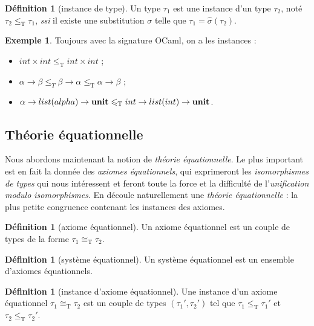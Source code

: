 \documentclass[a4paper]{report}
\theoremstyle{definition}
\newtheorem{definition}[theoreme]{Définition}
\newtheorem{exemple}[theoreme]{Exemple}
\newcommand{\ssi}{\textit{ssi}\xspace}
\newcommand{\unit}{\bold{unit}}
\newcommand{\T}{\mathrm{T}}
\begin{document}
\begin{definition}[instance de type]
  Un type $\tau_1$ est une instance d'un type $\tau_2$, noté $\tau_2 \leqslant_\T \tau_1$, \ssi il existe une substitution $\sigma$ telle que $\tau_1 = \hat\sigma (\tau_2)$.
\end{definition}

\begin{exemple}
  Toujours avec la signature OCaml, on a les instances :
  \begin{itemize}
    \item $int \times int \leqslant_\T int \times int$ ;
    \item $\alpha \rightarrow \beta \leqslant_T \beta \rightarrow \alpha \leqslant_\T \alpha \rightarrow \beta$ ;
    \item $\alpha \rightarrow list (alpha) \rightarrow \unit \leqslant_\T int \rightarrow list (int) \rightarrow \unit$.
  \end{itemize}
\end{exemple}


\subsection{Théorie équationnelle}

Nous abordons maintenant la notion de \emph{théorie équationnelle}. Le plus important est en fait la donnée des \emph{axiomes équationnels}, qui exprimeront les \emph{isomorphismes de types} qui nous intéressent  et feront toute la force et la difficulté de l'\emph{unification modulo isomorphismes}. En découle naturellement une \emph{théorie équationnelle} : la plus petite congruence contenant les instances des axiomes.

\begin{definition}[axiome équationnel]
  Un axiome équationnel est un couple de types de la forme $\tau_1 \cong_\T \tau_2$.
\end{definition}

\begin{definition}[système équationnel]
  Un système équationnel est un ensemble d'axiomes équationnels.
\end{definition}

\begin{definition}[instance d'axiome équationnel]
  Une instance d'un axiome équationnel $\tau_1 \cong_\T \tau_2$ est un couple de types $(\tau_1', \tau_2')$ tel que $\tau_1 \leqslant_\T \tau_1'$ et $\tau_2 \leqslant_\T \tau_2'$.
\end{definition}
\end{document}

